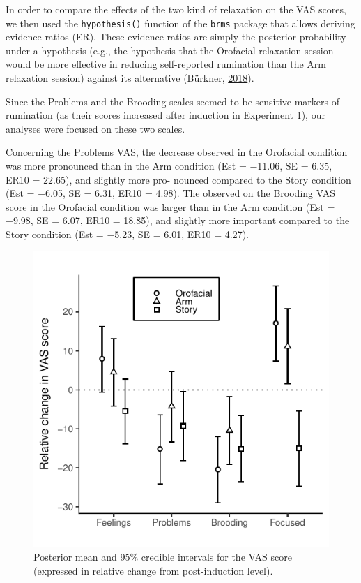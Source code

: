 \documentclass[a4paper,12pt,twoside,openright,oldfontcommands]{memoir}
\begin{document}
In order to compare the effects of the two kind of relaxation on the VAS scores, we then used the \texttt{hypothesis()} function of the \texttt{brms} package that allows deriving evidence ratios (ER). These evidence ratios are simply the posterior probability under a hypothesis (e.g., the hypothesis that the Orofacial relaxation session would be more effective in reducing self-reported rumination than the Arm relaxation session) against its alternative (Bürkner, \protect\hyperlink{ref-R-brms}{2018}).

Since the Problems and the Brooding scales seemed to be sensitive markers of rumination (as their scores increased after induction in Experiment 1), our analyses were focused on these two scales.

Concerning the Problems VAS, the decrease observed in the Orofacial condition was more pronounced than in the Arm condition (Est = −11.06, SE = 6.35, ER10 = 22.65), and slightly more pro- nounced compared to the Story condition (Est = −6.05, SE = 6.31, ER10 = 4.98). The observed on the Brooding VAS score in the Orofacial condition was larger than in the Arm condition (Est = −9.98, SE = 6.07, ER10 = 18.85), and slightly more important compared to the Story condition (Est = −5.23, SE = 6.01, ER10 = 4.27).

\begin{figure}[H]

{\centering \includegraphics[width=0.75\linewidth]{assets/emg_fig2} 

}

\caption{Posterior mean and 95\% credible intervals for the VAS score (expressed in relative change from post-induction level).}\label{fig:resultsemgfig2}
\end{figure}
\end{document}
